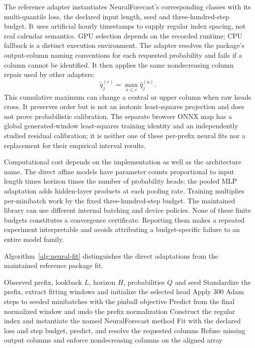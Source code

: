 The reference adapter instantiates NeuralForecast's corresponding classes with its multi-quantile loss, the declared input length, seed and three-hundred-step budget. It uses artificial hourly timestamps to supply regular index spacing, not real calendar semantics. GPU selection depends on the recorded runtime; CPU fallback is a distinct execution environment. The adapter resolves the package's output-column naming conventions for each requested probability and fails if a column cannot be identified. It then applies the same nondecreasing column repair used by other adapters:
\begin{equation}\label{eq:report-quantile-repair}
\widetilde q_j^{(r)}=\max_{a\le r}\widehat q_j^{(a)}.
\end{equation}
This cumulative maximum can change a central or upper column when raw heads cross. It preserves order but is not an isotonic least-squares projection and does not prove probabilistic calibration. The separate browser ONNX map has a global generated-window least-squares training identity and an independently studied residual calibration; it is neither one of these per-prefix neural fits nor a replacement for their empirical interval results.

Computational cost depends on the implementation as well as the architecture name. The direct affine models have parameter counts proportional to input length times horizon times the number of probability heads; the pooled MLP adaptation adds hidden-layer products at each pooling rate. Training multiplies per-minibatch work by the fixed three-hundred-step budget. The maintained library can use different internal batching and device policies. None of these finite budgets constitutes a convergence certificate. Reporting them makes a repeated experiment interpretable and avoids attributing a budget-specific failure to an entire model family.

Algorithm~\ref{alg:neural-fit} distinguishes the direct adaptations
from the maintained reference package fit.
\begin{algorithm}[htbp]
\caption{Fit direct or maintained neural quantile heads using training windows contained in the observed prefix.}
\label{alg:neural-fit}
\begin{algorithmic}[1]
\Require Observed prefix, lookback $L$, horizon $H$, probabilities $Q$ and seed
  \State Standardize the prefix, extract fitting windows and initialize the selected head
  \State Apply 300 Adam steps to seeded minibatches with the pinball objective
  \State Predict from the final normalized window and undo the prefix normalization
\Else
  \State Construct the regular index and instantiate the named NeuralForecast method
  \State Fit with the declared loss and step budget, predict, and resolve the requested columns
\EndIf
\State Refuse missing output columns and enforce nondecreasing columns on the aligned array
\end{algorithmic}
\end{algorithm}

